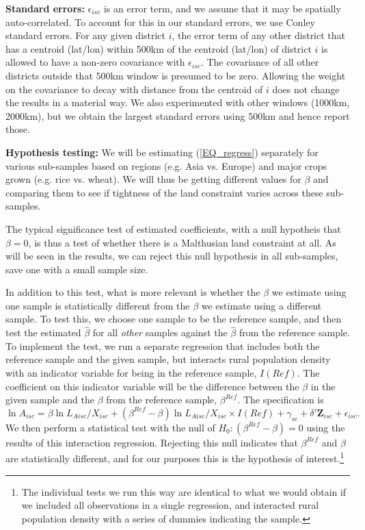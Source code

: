 \documentclass[11pt]{article}
\begin{document}
\vspace{.5cm}\noindent\textbf{Standard errors:} $\epsilon_{isc}$ is an error term, and we assume that it may be spatially auto-correlated. To account for this in our standard errors, we use Conley standard errors. For any given district $i$, the error term of any other district that has a centroid (lat/lon) within 500km of the centroid (lat/lon) of district $i$ is allowed to have a non-zero covariance with $\epsilon_{isc}$. The covariance of all other districts outside that 500km window is presumed to be zero. Allowing the weight on the covariance to decay with distance from the centroid of $i$ does not change the results in a material way. We also experimented with other windows (1000km, 2000km), but we obtain the largest standard errors using 500km and hence report those.

\vspace{.5cm}\noindent\textbf{Hypothesis testing:} We will be estimating (\ref{EQ_regress}) separately for various sub-samples based on regions (e.g. Asia vs. Europe) and major crops grown (e.g. rice vs. wheat). We will thus be getting different values for $\beta$ and comparing them to see if tightness of the land constraint varies across these sub-samples.
 
The typical significance test of estimated coefficients, with a null hypotheis that $\beta=0$, is thus a test of whether there is a Malthusian land constraint at all. As will be seen in the results, we can reject this null hypothesis in all sub-samples, save one with a small sample size.

In addition to this test, what is more relevant is whether the $\beta$ we estimate using one sample is statistically different from the $\beta$ we estimate using a different sample. To test this, we choose one sample to be the reference sample, and then test the estimated $\hat{\beta}$ for all \textit{other} samples against the $\hat{\beta}$ from the reference sample. To implement the test, we run a separate regression that includes both the reference sample and the given sample, but interacts rural population density with an indicator variable for being in the reference sample, $I(Ref)$. The coefficient on this indicator variable will be the difference between the $\beta$ in the given sample and the $\beta$ from the reference sample, $\beta^{Ref}$. The specification is
\begin{equation}
    \ln A_{isc} = \beta \ln L_{Aisc}/X_{isc} + (\beta^{Ref} - \beta) \ln L_{Aisc}/X_{isc} \times I(Ref) + \gamma_{sc} + \delta' \mathbf{Z}_{isc} + \epsilon_{isc}. \label{EQ_interaction}
\end{equation}
We then perform a statistical test with the null of $H_0: (\beta^{Ref} - \beta) = 0$ using the results of this interaction regression. Rejecting this null indicates that $\beta^{Ref}$ and $\beta$ are statistically different, and for our purposes this is the hypothesis of interest.\footnote{The individual tests we run this way are identical to what we would obtain if we included all observations in a single regression, and interacted rural population density with a series of dummies indicating the sample.} 
\end{document}
